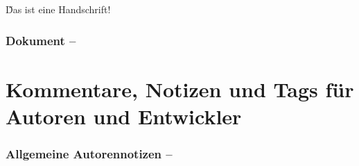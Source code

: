 \documentclass[ngerman,paper=a4,fontsize=8pt,headings=small,draft=no,parskip=half,noonelinecaption]{scrreprt}
\begin{document}
{

\H{Das ist eine Handschrift!}}






\subsubsection{Dokument -- }

% 
% 
% 





\section{Kommentare, Notizen und Tags für Autoren und Entwickler}



\subsubsection{Allgemeine Autorennotizen -- }

% 
% 
% 
\end{document}
